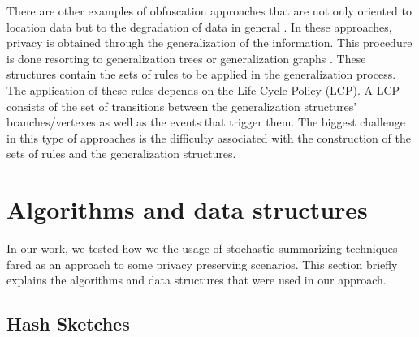 There are other examples of obfuscation approaches that are not only
oriented to location data but to the degradation of data in general
\cite{anciaux2008instantdb,heerde2006data}. In these approaches,
privacy is obtained through the generalization of the information.
This procedure is done resorting to generalization trees
\cite{anciaux2008instantdb} or generalization graphs
\cite{heerde2006data}. These structures contain the sets of rules to
be applied in the generalization process. The application of these
rules depends on the Life Cycle Policy (LCP). A LCP consists of the
set of transitions between the generalization structures'
branches/vertexes as well as the events that trigger them. The biggest
challenge in this type of approaches is the difficulty associated with 
the construction of the sets of rules and the generalization
structures.


\section{Algorithms and data structures}
\label{sec:algorithms_and_data_structures}
In our work, we tested how we the usage of stochastic summarizing
techniques fared as an approach to some privacy preserving scenarios.
This section briefly explains the algorithms and data structures that
were used in our approach.

\subsection{Hash Sketches}
\label{sec:hash_sketches}

